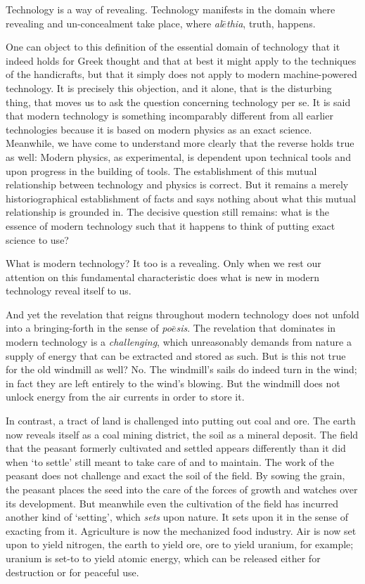 \documentclass[paper=a4, fontsize=11pt,twoside]{scrartcl}
\begin{document}
Technology is a way of revealing. Technology manifests in the domain where revealing and un-concealment take place, where \textit{al$\bar{e}$thia}, truth, happens.

One can object to this definition of the essential domain of technology that it indeed holds for Greek thought and that at best it might apply to the techniques of the handicrafts, but that it simply does not apply to modern machine-powered technology. It is precisely this objection, and it alone, that is the disturbing thing, that moves us to ask the question concerning technology per se. It is said that modern technology is something incomparably different from all earlier technologies because it is based on modern physics as an exact science. Meanwhile, we have come to understand more clearly that the reverse holds true as well: Modern physics, as experimental, is dependent upon technical tools and upon progress in the building of tools. The establishment of this mutual relationship between technology and physics is correct. But it remains a merely historiographical establishment of facts and says nothing about what this mutual relationship is grounded in. The decisive question still remains: what is the essence of modern technology such that it happens to think of putting exact science to use?

What is modern technology? It too is a revealing. Only when we rest our attention on this fundamental characteristic does what is new in modern technology reveal itself to us. 

And yet the revelation that reigns throughout modern technology does not unfold into a bringing-forth in the sense of \textit{po$\bar{e}$sis}. The revelation that dominates in modern technology is a \textit{challenging}, which unreasonably demands from nature a supply of energy that can be extracted and stored as such. But is this not true for the old windmill as well? No. The windmill's sails do indeed turn in the wind; in fact they are left entirely to the wind's blowing. But the windmill does not unlock energy from the air currents in order to store it.

In contrast, a tract of land is challenged into putting out coal and ore. The earth now reveals itself as a coal mining district, the soil as a mineral deposit. The field that the peasant formerly cultivated and settled appears differently than it did when `to settle' still meant to take care of and to maintain. The work of the peasant does not challenge and exact the soil of the field. By sowing the grain, the peasant places the seed into the care of the forces of growth and watches over its development. But meanwhile even the cultivation of the field has incurred another kind of `setting', which \textit{sets} upon nature. It sets upon it in the sense of exacting from it. Agriculture is now the mechanized food industry. Air is now set upon to yield nitrogen, the earth to yield ore, ore to yield uranium, for example; uranium is set-to to yield atomic energy, which can be released either for destruction or for peaceful use.
\end{document}
